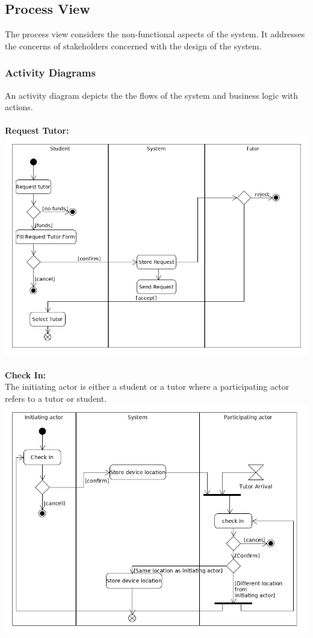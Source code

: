 \documentclass[12pt]{article}
\begin{document}
\subsection{Process View}
The process view considers the non-functional aspects of the system. It addresses the concerns of stakeholders concerned
with the design of the system.

\subsubsection{Activity Diagrams}
An activity diagram depicts the the flows of the system and business logic with actions.\\
\\\textbf{Request Tutor:}\\
\includegraphics[width=140mm]{./activity_diagram/request_tutor.png}
\\\\\textbf{Check In:}\\
The initiating actor is either a student or a tutor where a participating actor refers to a tutor or student.\\
\includegraphics[width=140mm]{./activity_diagram/checked_in.png}
\end{document}
